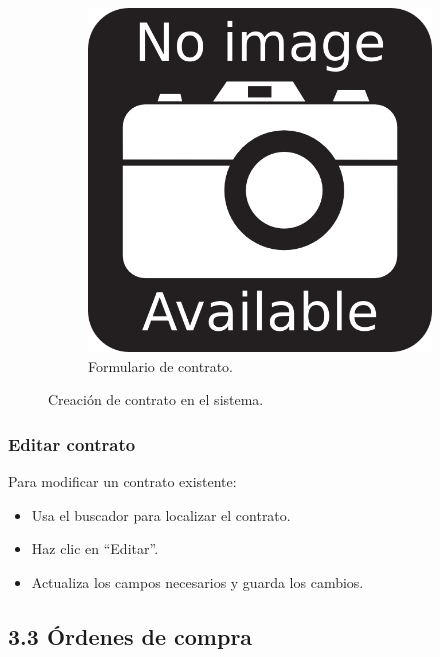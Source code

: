 \begin{figure}[h]
\centering
\begin{subfigure}{0.4\textwidth}
    \includegraphics[width=\textwidth]{imgs/no-image.png}
    \caption{Formulario de contrato.}
    \label{fig:admin3}
\end{subfigure}
\caption{Creación de contrato en el sistema.}
\end{figure}

\subsubsection{Editar contrato}

Para modificar un contrato existente:

\begin{itemize}
    \item Usa el buscador para localizar el contrato.
    \item Haz clic en “Editar”.
    \item Actualiza los campos necesarios y guarda los cambios.
\end{itemize}

\subsection{3.3 Órdenes de compra}

